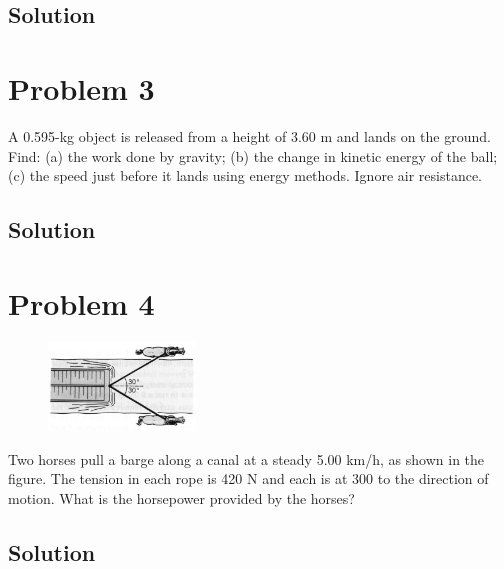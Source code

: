 \documentclass[12pt]{article}
\begin{document}
\subsection*{Solution}


\pagebreak
\section*{Problem 3}
A 0.595-kg object is released from a height of 3.60 m and lands on the ground. Find: (a) the work done by gravity; (b) the change in kinetic energy of the ball; (c) the speed just before it lands using energy methods. Ignore air resistance.

\subsection*{Solution}


\pagebreak
\section*{Problem 4}
\begin{figure}
    \vspace{-30pt}
    \includegraphics[width=0.35\textwidth]{graph_4.png} 
\end{figure}
Two horses pull a barge along a canal at a steady 5.00 km/h, as shown in the figure. The tension in each rope is 420 N and each is at 300 to the direction of motion. What is the horsepower provided by the horses?

\subsection*{Solution}


\pagebreak
\end{document}
